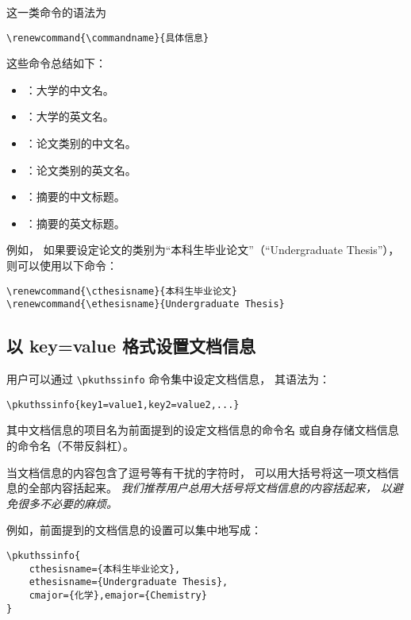 		这一类命令的语法为
\begin{Verbatim}[frame=single]
% commandname 为具体的命令名。
\renewcommand{\commandname}{具体信息}
\end{Verbatim}

		这些命令总结如下：
		\begin{itemize}
			\item \texttt{\bfseries\string\cuniversity}：大学的中文名。
			\item \texttt{\bfseries\string\euniversity}：大学的英文名。
			\item \texttt{\bfseries\string\cthesisname}：论文类别的中文名。
			\item \texttt{\bfseries\string\ethesisname}：论文类别的英文名。
			\item \texttt{\bfseries\string\cabstractname}：摘要的中文标题。
			\item \texttt{\bfseries\string\eabstractname}：摘要的英文标题。
		\end{itemize}

		例如，
		如果要设定论文的类别为“本科生毕业论文”（“Undergraduate Thesis”），
		则可以使用以下命令：
\begin{Verbatim}[frame=single]
\renewcommand{\cthesisname}{本科生毕业论文}
\renewcommand{\ethesisname}{Undergraduate Thesis}
\end{Verbatim}

		\subsection{以 key=value 格式设置文档信息}

		用户可以通过 \verb|\pkuthssinfo| 命令集中设定文档信息，
		其语法为：
\begin{Verbatim}[frame=single]
% key1、key2、value1、value2 等为具体文档信息的项目名和内容。
\pkuthssinfo{key1=value1,key2=value2,...}
\end{Verbatim}
		其中文档信息的项目名为前面提到的设定文档信息的命令名%
		或自身存储文档信息的命令名（不带反斜杠）。

		当文档信息的内容包含了逗号等有干扰的字符时，
		可以用大括号将这一项文档信息的全部内容括起来。%
		\emph{%
			我们推荐用户总用大括号将文档信息的内容括起来，
			以避免很多不必要的麻烦。%
		}

		例如，前面提到的文档信息的设置可以集中地写成：
\begin{Verbatim}[frame=single,tabsize=4]
\pkuthssinfo{
	cthesisname={本科生毕业论文},
	ethesisname={Undergraduate Thesis},
	cmajor={化学},emajor={Chemistry}
}
\end{Verbatim}

